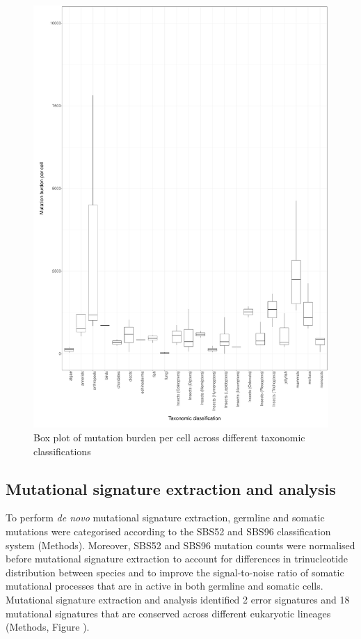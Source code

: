 \begin{figure}[htbp!]
\caption{Box plot of mutation burden per cell across different taxonomic classifications}
\label{figure:mutation-burden-per-cell}
\begin{centering}
\includegraphics[width=\textwidth]{Vector/dtol_mutation_burden_per_cell.pdf}
\end{centering}
\end{figure}

\subsection{Mutational signature extraction and analysis}

To perform \textit{de novo} mutational signature extraction, germline and somatic mutations were categorised according to the SBS52 and SBS96 classification system (Methods). Moreover, SBS52 and SBS96 mutation counts were normalised before mutational signature extraction to account for differences in trinucleotide distribution between species and to improve the signal-to-noise ratio of somatic mutational processes that are in active in both germline and somatic cells. Mutational signature extraction and analysis identified 2 error signatures and 18 mutational signatures that are conserved across different eukaryotic lineages (Methods, Figure ). 

